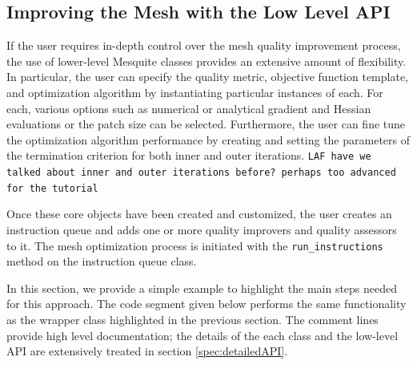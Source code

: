 \documentclass[letter]{report}
\begin{document}
\subsection{Improving the Mesh with the Low Level API}
\label{sec:tutDetailedAPI}
If the user requires in-depth control over the mesh quality improvement
process, the use of lower-level Mesquite classes provides an extensive
amount of flexibility.   In particular, the user can specify the quality
metric, objective function template, and optimization algorithm by
instantiating particular instances of each.  For each, various options
such as numerical or analytical gradient and Hessian evaluations or
the patch size can be selected.  Furthermore, the user can fine tune
the optimization algorithm performance by creating and setting the parameters 
of the termination criterion for both inner and outer iterations.
{\tt LAF have we talked about inner and outer iterations before? perhaps
too advanced for the tutorial}

Once these core objects have been created and customized, the user
creates an instruction queue and adds one or more quality improvers
and quality assessors to it.  The mesh optimization process is initiated
with the {\tt run\_instructions} method on the instruction queue
class.

In this section, we provide a simple example to highlight the main
steps needed for this approach.  The code segment given below performs
the same functionality as the wrapper class highlighted in the
previous section.  The comment lines provide high level documentation;
the details of the each class and the low-level API are extensively
treated in section
\ref{spec:detailedAPI}.
\end{document}
